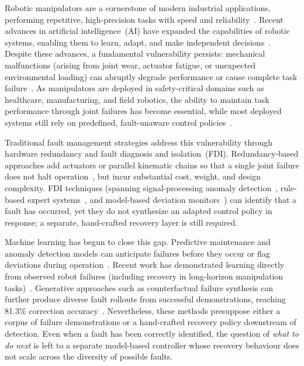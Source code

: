 \documentclass{article}
\begin{document}
	Robotic manipulators are a cornerstone of modern industrial applications, performing repetitive,
	high-precision tasks with speed and reliability~\citep{ali2018vision, ghodsian2023mobile}. Recent
	advances in artificial intelligence~(AI) have expanded the capabilities of robotic systems, enabling
	them to learn, adapt, and make independent decisions~\citep{sun2021artificial, liu2021deep,
	li2024manipllm}.  Despite these advances, a fundamental vulnerability persists: mechanical
	malfunctions (arising from joint wear, actuator fatigue, or unexpected environmental loading) can
	abruptly degrade performance or cause complete task failure~\citep{291826, sciavicco2012modelling}.
	As manipulators are deployed in safety-critical domains such as healthcare, manufacturing, and field
	robotics, the ability to maintain task performance through joint failures has become essential, while
	most deployed systems still rely on predefined, fault-unaware control
	policies~\citep{deloitte2025smart, allaboutai2025report}.

	Traditional fault management strategies address this vulnerability through hardware redundancy and
	fault diagnosis and isolation~(FDI). Redundancy-based approaches add actuators or parallel kinematic
	chains so that a single joint failure does not halt operation~\citep{291826, anand2012fault,
	mokhtari2022fault}, but incur substantial cost, weight, and design complexity. FDI techniques
	(spanning signal-processing anomaly detection~\citep{kimevaluation, ompusunggu2014winding}, rule-based
	expert systems~\citep{li2023open}, and model-based deviation monitors~\citep{shuai2022research,
	sabry2019fault}) can identify that a fault has occurred, yet they do not synthesize an adapted control
	policy in response; a separate, hand-crafted recovery layer is still required.

	Machine learning has begun to close this gap. Predictive maintenance and anomaly detection models can
	anticipate failures before they occur or flag deviations during operation~\citep{lian2022anomaly,
	eski2011fault}.  Recent work has demonstrated learning directly from observed robot failures
	(including recovery in long-horizon manipulation tasks)~\citep{huang2025fail2progress}.
	Generative approaches such as counterfactual failure synthesis can further produce diverse fault
	rollouts from successful demonstrations, reaching 81.3\% correction accuracy~\citep{wang2025learning}.
	Nevertheless, these methods presuppose either a corpus of failure demonstrations or a
	hand-crafted recovery policy downstream of detection. Even when a fault has been correctly
	identified, the question of \emph{what to do next} is left to a separate model-based controller
	whose recovery behaviour does not scale across the diversity of possible faults.
\end{document}
